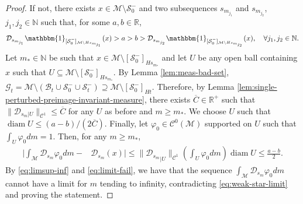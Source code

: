 \documentclass{amsart}
\numberwithin{equation}{section}
\newcommand\vf{\varphi}
\renewcommand{\ge}{\geqslant}
\renewcommand{\le}{\leqslant}
\newcommand\cB{{\mathcal B}}
\newcommand\cC{{\mathcal C}}
\newcommand\cG{{\mathcal G}}
\newcommand\cM{{\mathcal M}}
\newcommand\cS{{\mathcal S}}
\newcommand\bN{{\mathbb N}}
\newcommand\bR{{\mathbb R}}
\newcommand{\Deriv}{\mathcal D}
\newcommand{\diam}{\operatorname{diam}}
\begin{document}
\begin{proof}
If not, there exists \(x \in \cM \setminus \cS_{0}^{-}\) and two subsequences \(s_{m_{j_1}}\) and \(s_{m_{j_2}}\), \(j_1, j_2 \in \bN\) such that, for some \(a, b \in \bR\),
\begin{equation}\label{eq:limsup-inf}
\Deriv_{s_{m_{j_1}}}\mathbbm{1}_{[\cS_0^-]_{\cM \setminus Hs_{m_{j_1}}}}(x) > a >b > \Deriv_{s_{m_{j_2}}}\mathbbm{1}_{[\cS_0^-]_{\cM \setminus Hs_{m_{j_2}}}}(x), \quad \forall j_1, j_2 \in \bN.
\end{equation}
Let \(m_{*} \in \bN\) be such that \(x \in \cM \setminus [\cS_0^-]_{Hs_{m_{*}}}\) and let \(U\) be any open ball containing \(x\) such that \(U\subseteq \cM \setminus [\cS_0^{-}]_{Hs_{m_{*}}}\). By Lemma \ref{lem:meas-bad-set}, \(\cG_t = \cM \setminus (\cB_t \cup \cS_0^{-} \cup \cS_t^{-})  \supseteq \cM \setminus [\cS_0^{-}]_{Ht}\). Therefore, by Lemma \ref{lem:single-perturbed-preimage-invariant-measure}, there exists \(\overline C \in \bR^+\) such that \(\|\Deriv_{s_m| U}\|_{\cC^1} \le \overline C\) for any \(U\) as before and \(m \ge m_{*}\). We choose \(U\) such that \(\diam U \le (a-b)/(2\overline C)\). Finally, let \(\vf_0 \in \cC^0(\cM)\) supported on \(U\) such that \(\int_{U}\vf_0 dm = 1\). Then, for any \(m \ge m_{*}\),
\begin{equation}\label{eq:limit-fail}
\begin{split}
    \biggl|\int_{\cM} \Deriv_{s_{m}} \vf_0 dm -& \Deriv_{s_m}(x)\biggr| \le  \|{\Deriv_{s_m}}_{|U}\|_{\cC^1} \left(\int_{U} \vf_0 dm\right) \diam U \le \frac{a-b}{2}.
\end{split}
\end{equation}
By \eqref{eq:limsup-inf} and \eqref{eq:limit-fail}, we have that the sequence \(\int_{\cM} \Deriv_{s_{m}} \vf_0  dm\) cannot have a limit for \(m\) tending to infinity, contradicting \eqref{eq:weak-star-limit} and proving the statement.
\end{proof}
\end{document}
